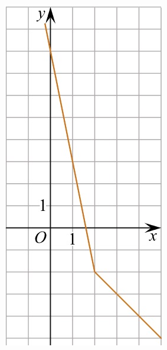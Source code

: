 \begin{class}[number=5]
\begin{listofex}
\begin{minipage}[c]{0.15\textwidth}
			\includegraphics[align=t, width=\textwidth]{pics/G111M4C5-4.jpg}

\end{minipage}
\end{listofex}
\end{class}
